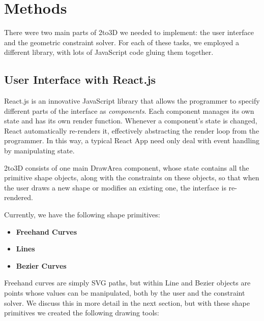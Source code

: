 \section{Methods}

There were two main parts of 2to3D we needed to implement: the user interface and the geometric constraint solver. For each of these tasks, we employed a different library, with lots of JavaScript code gluing them together.

\subsection*{User Interface with React.js}

React.js is an innovative JavaScript library that allows the programmer to specify different parts of the interface as {\it components}. Each component manages its own state and has its own render function. Whenever a component's state is changed, React automatically re-renders it, effectively abstracting the render loop from the programmer. In this way, a typical React App need only deal with event handling by manipulating state.

2to3D consists of one main DrawArea component, whose state contains all the primitive shape objects, along with the constraints on these objects, so that when the user draws a new shape or modifies an existing one, the interface is re-rendered.


Currently, we have the following shape primitives:

\begin{itemize}
\item {\bf Freehand Curves}
\item {\bf Lines}
\item {\bf Bezier Curves}
\end{itemize}

Freehand curves are simply SVG paths, but within Line and Bezier objects are points whose values can be manipulated, both by the user and the constraint solver. We discuss this in more detail in the next section, but with these shape primitives we created the following drawing tools:

